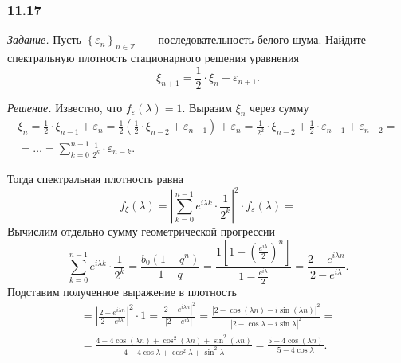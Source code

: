 \subsubsection*{11.17}

\textit{Задание.}
Пусть
$ \left\{ \varepsilon_n \right\}_{n \in \mathbb{Z}}$~---~последовательность
белого шума.
Найдите спектральную плотность стационарного решения уравнения
\begin{equation*}
  \xi_{n + 1} =
  \frac{1}{2} \cdot \xi_n + \varepsilon_{n + 1}.
\end{equation*}

\textit{Решение.}
Известно, что $f_{ \varepsilon } \left( \lambda \right) = 1$.
Выразим $ \xi_n$ через сумму
\begin{gather*}
  \xi_n =
  \frac{1}{2} \cdot \xi_{n - 1} + \varepsilon_n =
  \frac{1}{2} \left(
    \frac{1}{2} \cdot \xi_{n - 2} + \varepsilon_{n - 1}
  \right) + \varepsilon_n =
  \frac{1}{2^2} \cdot \xi_{n - 2} + \frac{1}{2} \cdot \varepsilon_{n - 1} +
  \varepsilon_{n - 2} = \\
  = \dotsc =
  \sum \limits_{k = 0}^{n - 1} \frac{1}{2^k} \cdot \varepsilon_{n - k}.
\end{gather*}

Тогда спектральная плотность равна
\begin{equation*}
  f_{ \xi } \left( \lambda \right) =
  \left|
    \sum \limits_{k = 0}^{n - 1} e^{i \lambda k} \cdot \frac{1}{2^k}
  \right|^2 \cdot f_{ \varepsilon } \left( \lambda \right) =
\end{equation*}
Вычислим отдельно сумму геометрической прогрессии
\begin{equation*}
  \sum \limits_{k = 0}^{n - 1} e^{i \lambda k} \cdot \frac{1}{2^k} =
  \frac{b_0 \left( 1 - q^n \right) }{1 - q} =
  \frac{1 \left[ 1 - \left( \frac{e^{i \lambda }}{2} \right)^n \right] }{1 - \frac{e^{i \lambda }}{2}} =
  \frac{2 - e^{i \lambda n}}{2 - e^{i \lambda }}.
\end{equation*}
Подставим полученное выражение в плотность
\begin{gather*}
  = \left| \frac{2 - e^{i \lambda n}}{2 - e^{i \lambda }} \right|^2 \cdot 1 =
  \frac{ \left| 2 - e^{i \lambda n} \right|^2}{ \left| 2 - e^{i \lambda} \right| } =
  \frac{ \left| 2 - \cos \left( \lambda n \right) - i \sin \left( \lambda n \right) \right|^2}{ \left| 2 - \cos \lambda - i \sin \lambda \right|^2 } = \\
  = \frac{4 - 4 \cos \left( \lambda n \right) + \cos^2 \left( \lambda n \right) + \sin^2 \left( \lambda n \right) }{4 - 4 \cos \lambda + \cos^2 \lambda + \sin^2 \lambda } =
  \frac{5 - 4 \cos \left( \lambda n \right) }{5 - 4 \cos \lambda }.
\end{gather*}
